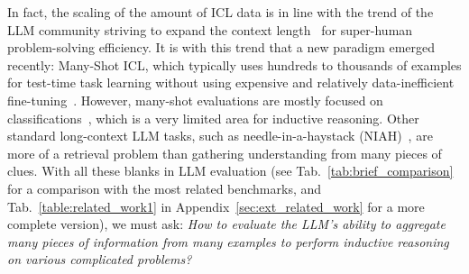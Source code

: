 In fact, the scaling of the amount of ICL data is in line with the trend of the LLM community striving to expand the context length~\citep{peng2023yarn, su2024roformer} for super-human problem-solving efficiency. It is with this trend that a new paradigm emerged recently: Many-Shot ICL, which typically uses hundreds to thousands of examples for test-time task learning without using expensive and relatively data-inefficient fine-tuning~\citep{agarwal2024many}. However, many-shot evaluations are mostly focused on classifications~\citep{li2023context, bertsch2024context, zhao2024probing, li2024long, zou2024retrieval}, which is a very limited area for inductive reasoning. Other standard long-context LLM tasks, such as needle-in-a-haystack (NIAH)~\citep{niah}, are more of a retrieval problem than gathering understanding from many pieces of clues. With all these blanks in LLM evaluation (see Tab.~\ref{tab:brief_comparison} for a comparison with the most related benchmarks, and Tab.~\ref{table:related_work1} in Appendix~\ref{sec:ext_related_work} for a more complete version), we must ask: \textit{How to evaluate the LLM's ability to aggregate many pieces of information from many examples to perform inductive reasoning on various complicated problems?}

